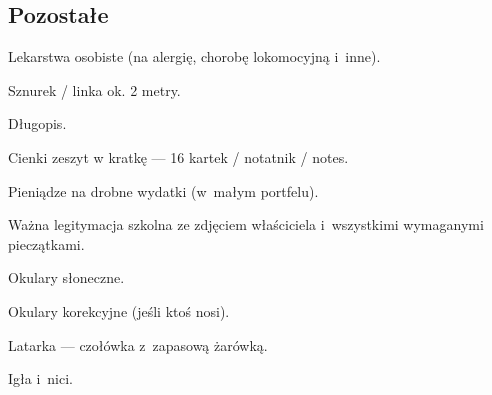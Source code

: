 \subsection{Pozostałe}
\begin{checklist}
\item Lekarstwa osobiste (na alergię, chorobę lokomocyjną i~inne).
\item Sznurek / linka ok. 2 metry.
\item Długopis.
\item Cienki zeszyt w kratkę --- 16 kartek / notatnik / notes.
\item Pieniądze na drobne wydatki (w~małym portfelu).
\item Ważna legitymacja szkolna ze zdjęciem właściciela i~wszystkimi wymaganymi pieczątkami.
\item Okulary słoneczne.
\item Okulary korekcyjne (jeśli ktoś nosi).
\item Latarka --- czołówka z~zapasową żarówką.
\item Igła i~nici.
\end{checklist}